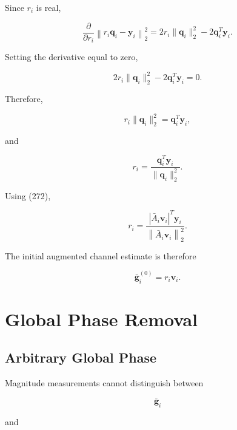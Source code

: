 \documentclass[12pt,a4paper]{article}
\begin{document}
Since $r_i$ is real,

\begin{equation}
\frac{\partial}{\partial r_i}
\left\|
r_i\mathbf q_i-\mathbf y_i
\right\|_2^2
=
2r_i\|\mathbf q_i\|_2^2
-
2\mathbf q_i^T\mathbf y_i.
\tag{275}
\end{equation}

Setting the derivative equal to zero,

\begin{equation}
2r_i\|\mathbf q_i\|_2^2
-
2\mathbf q_i^T\mathbf y_i
=
0.
\tag{276}
\end{equation}

Therefore,

\begin{equation}
r_i\|\mathbf q_i\|_2^2
=
\mathbf q_i^T\mathbf y_i,
\tag{277}
\end{equation}

and

\begin{equation}
\boxed{
r_i
=
\frac{
\mathbf q_i^T\mathbf y_i
}{
\|\mathbf q_i\|_2^2
}
}.
\tag{278}
\end{equation}

Using (272),

\begin{equation}
\boxed{
r_i
=
\frac{
\left|
\bar A_i\mathbf v_i
\right|^T
\mathbf y_i
}{
\left\|
\bar A_i\mathbf v_i
\right\|_2^2
}
}.
\tag{279}
\end{equation}

The initial augmented channel estimate is therefore

\begin{equation}
\boxed{
\bar{\mathbf g}_i^{(0)}
=
r_i\mathbf v_i
}.
\tag{280}
\end{equation}

\section{Global Phase Removal}

\subsection{Arbitrary Global Phase}

Magnitude measurements cannot distinguish between

\begin{equation}
\bar{\mathbf g}_i
\tag{281}
\end{equation}

and
\end{document}
